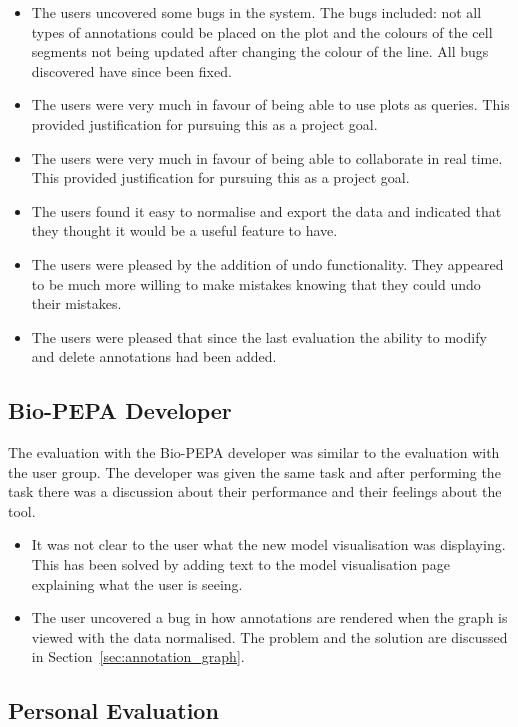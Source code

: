 \begin{itemize}
\item The users uncovered some bugs in the system.  The bugs included: not all types of annotations could be placed on the plot and the colours of the cell segments not being updated after changing the colour of the line.  All bugs discovered have since been fixed.
\item The users were very much in favour of being able to use plots as queries.  This provided justification for pursuing this as a project goal.
\item The users were very much in favour of being able to collaborate in real time. This provided justification for pursuing this as a project goal.
\item The users found it easy to normalise and export the data and indicated that they thought it would be a useful feature to have.
\item The users were pleased by the addition of undo functionality.  They appeared to be much more willing to make mistakes knowing that they could undo their mistakes.
\item The users were pleased that since the last evaluation the ability to modify and delete annotations had been added.
\end{itemize}

\subsection{Bio-PEPA Developer}

The evaluation with the Bio-PEPA developer was similar to the evaluation with the user group.  The developer was given the same task and after performing the task there was a discussion about their performance and their feelings about the tool.

\begin{itemize}
\item It was not clear to the user what the new model visualisation was displaying.  This has been solved by adding text to the model visualisation page explaining what the user is seeing.
\item The user uncovered a bug in how annotations are rendered when the graph is viewed with the data normalised.  The problem and the solution are discussed in Section~\ref{sec:annotation_graph}.
\end{itemize}

\subsection{Personal Evaluation}

